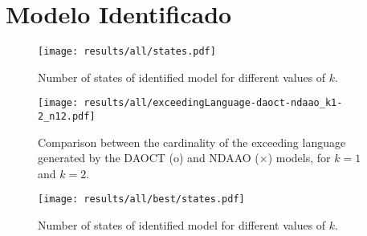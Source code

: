 
\section{Modelo Identificado}
\begin{figure}[H]
  \centering
  \texttt{[image: results/all/states.pdf]}
  \caption{Number of states of identified model for different values of $k$.}
    \label{fig:statesIdentOriginal}
\end{figure}
\begin{figure}[H]
  \centering
  \texttt{[image: results/all/exceedingLanguage-daoct-ndaao\_k1-2\_n12.pdf]}
  \caption[Comparison between the cardinality of the exceeding language generated by the DAOCT and
NDAAO.]{Comparison between the cardinality of the exceeding language generated by the DAOCT (o) and
NDAAO ($\times$) models, for $k=1$ and $k=2$.}
    \label{fig:daoctNdaaoOriginal}
\end{figure}
\begin{figure}[H]
  \centering
  \texttt{[image: results/all/best/states.pdf]}
  \caption{Number of states of identified model for different values of $k$.}
    \label{fig:statesIdentBest}
\end{figure}

